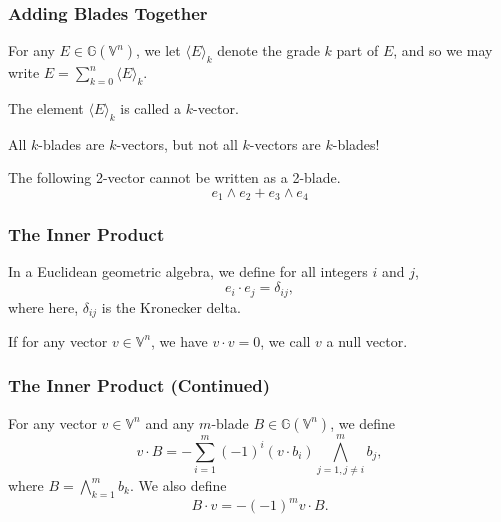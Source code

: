 \documentclass{beamer}
\newcommand{\G}{\mathbb{G}}
\newcommand{\V}{\mathbb{V}}
\begin{document}
\begin{frame}
\frametitle{Adding Blades Together}
\begin{definition}
For any $E\in\G(\V^n)$, we let $\langle E\rangle_k$ denote the grade $k$ part of $E$,
and so we may write $E = \sum_{k=0}^n\langle E\rangle_k$.
\end{definition}\pause
The element $\langle E\rangle_k$ is called a $k$-vector.\pause

All $k$-blades are $k$-vectors, but not all $k$-vectors are $k$-blades!\pause
\begin{example}
The following 2-vector cannot be written as a 2-blade.
\begin{equation*}
e_1\wedge e_2 + e_3\wedge e_4
\end{equation*}
\end{example}
\end{frame}


\begin{frame}
\frametitle{The Inner Product}
\begin{definition}
In a Euclidean geometric algebra, we define for all integers $i$ and $j$,
\begin{equation*}
e_i\cdot e_j = \delta_{ij},
\end{equation*}
where here, $\delta_{ij}$ is the Kronecker delta.
\end{definition}
\begin{definition}
If for any vector $v\in\V^n$, we have $v\cdot v=0$, we call $v$ a
null vector.
\end{definition}
\end{frame}

\begin{frame}
\frametitle{The Inner Product (Continued)}
\begin{definition}
For any vector $v\in\V^n$ and any $m$-blade $B\in\G(\V^n)$, we define
\begin{equation*}
v\cdot B = -\sum_{i=1}^m (-1)^i (v\cdot b_i)\bigwedge_{j=1,j\neq i}^m b_j,
\end{equation*}
where $B = \bigwedge_{k=1}^m b_k$.  We also define
\begin{equation*}
B\cdot v = -(-1)^m v\cdot B.
\end{equation*}
\end{definition}
\end{frame}
\end{document}
